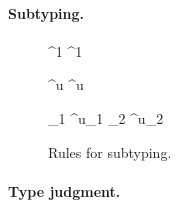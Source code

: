 \documentclass[runningheads]{llncs}
\begin{document}
\paragraph{Subtyping.}

\begin{figure}[t]

  {\tenv \vdash {} \TREF^1 \subt {} \TREF^1}

  {\tenv \vdash {} \TREF^{u} \subt {} \TREF^{u}}

  {\tenv \vdash \typ_1 \TREF^{u_1} \subt \typ_2 \TREF^{u_2}}
  
  \caption{Rules for subtyping.}
  \label{fig:subtyping}
\end{figure}

\paragraph{Type judgment.}
\end{document}
